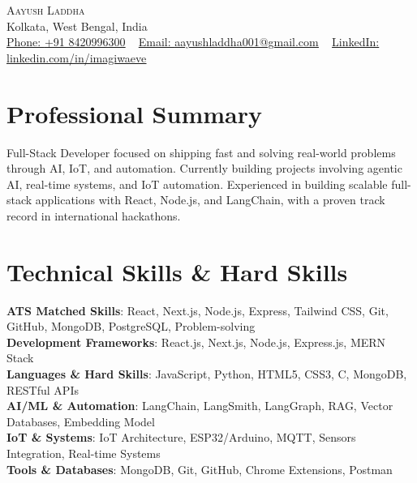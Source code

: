 \documentclass[letterpaper,11pt]{article}
\begin{document}
\begin{center}
    {\Huge \scshape Aayush Laddha} \\ \vspace{1pt}
    Kolkata, West Bengal, India \\ \vspace{1pt}
    \small \href{tel:+918420996300}{Phone: \underline{+91 8420996300}} ~ \href{mailto:aayushladdha001@gmail.com}{Email: \underline{aayushladdha001@gmail.com}} ~ 
    \href{https://www.linkedin.com/in/imagiwaeve}{LinkedIn: \underline{linkedin.com/in/imagiwaeve}}
    \vspace{-8pt}
\end{center}

\section{Professional Summary}
\small{Full-Stack Developer focused on shipping fast and solving real-world problems through AI, IoT, and automation. Currently building projects involving agentic AI, real-time systems, and IoT automation. Experienced in building scalable full-stack applications with React, Node.js, and LangChain, with a proven track record in international hackathons.}
\vspace{-10pt}

\section{Technical Skills \& Hard Skills}
 \begin{itemize}[leftmargin=0.15in, label={}]
    \small{\item{
     \textbf{ATS Matched Skills}{: React, Next.js, Node.js, Express, Tailwind CSS, Git, GitHub, MongoDB, PostgreSQL, Problem-solving} \\
     \textbf{Development Frameworks}{: React.js, Next.js, Node.js, Express.js, MERN Stack} \\
     \textbf{Languages \& Hard Skills}{: JavaScript, Python, HTML5, CSS3, C, MongoDB, RESTful APIs} \\
     \textbf{AI/ML \& Automation}{: LangChain, LangSmith, LangGraph, RAG, Vector Databases, Embedding Model} \\
     \textbf{IoT \& Systems}{: IoT Architecture, ESP32/Arduino, MQTT, Sensors Integration, Real-time Systems} \\
     \textbf{Tools \& Databases}{: MongoDB, Git, GitHub, Chrome Extensions, Postman}
    }}
 \end{itemize}
 \vspace{-16pt}
\end{document}
